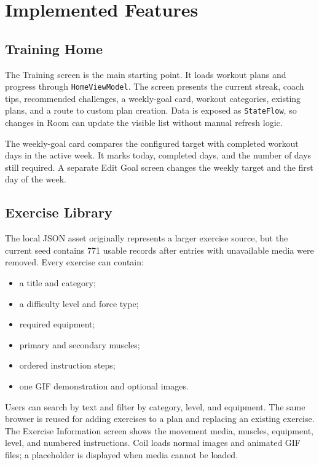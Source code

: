 \section{Implemented Features}

\subsection{Training Home}

The Training screen is the main starting point. It loads workout plans and progress through \texttt{HomeViewModel}. The screen presents the current streak, coach tips, recommended challenges, a weekly-goal card, workout categories, existing plans, and a route to custom plan creation. Data is exposed as \texttt{StateFlow}, so changes in Room can update the visible list without manual refresh logic.

The weekly-goal card compares the configured target with completed workout days in the active week. It marks today, completed days, and the number of days still required. A separate Edit Goal screen changes the weekly target and the first day of the week.

\subsection{Exercise Library}

The local JSON asset originally represents a larger exercise source, but the current seed contains 771 usable records after entries with unavailable media were removed. Every exercise can contain:

\begin{itemize}
    \item a title and category;
    \item a difficulty level and force type;
    \item required equipment;
    \item primary and secondary muscles;
    \item ordered instruction steps;
    \item one GIF demonstration and optional images.
\end{itemize}

Users can search by text and filter by category, level, and equipment. The same browser is reused for adding exercises to a plan and replacing an existing exercise. The Exercise Information screen shows the movement media, muscles, equipment, level, and numbered instructions. Coil loads normal images and animated GIF files; a placeholder is displayed when media cannot be loaded.

